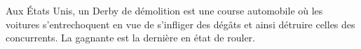 

Aux États Unis, un Derby de démolition est une course automobile où les voitures s'entrechoquent en vue de s'infliger des dégâts et ainsi détruire celles des concurrents. La gagnante est la dernière en état de rouler.


